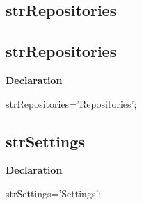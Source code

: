 \documentclass{report}
\newif\ifpdf
\begin{document}
\subsection*{\large{\textbf{strRepositories}}\normalsize\hspace{1ex}\hrulefill}
\else
\subsection*{strRepositories}
\fi
\label{trstrings-strRepositories}
\begin{list}{}{
\setlength{\itemindent}{0cm}
\setlength{\listparindent}{0cm}
\setlength{\leftmargin}{\evensidemargin}
\addtolength{\leftmargin}{\tmplength}
\settowidth{\labelsep}{X}
\addtolength{\leftmargin}{\labelsep}
\setlength{\labelwidth}{\tmplength}
}
\item[\textbf{Declaration}\hfill]
\ifpdf
\begin{flushleft}
\fi
\begin{ttfamily}
strRepositories='Repositories';\end{ttfamily}

\ifpdf
\end{flushleft}
\fi

\end{list}
\ifpdf
\subsection*{\large{\textbf{strSettings}}\normalsize\hspace{1ex}\hrulefill}
\else
\subsection*{strSettings}
\fi
\label{trstrings-strSettings}
\begin{list}{}{
\setlength{\itemindent}{0cm}
\setlength{\listparindent}{0cm}
\setlength{\leftmargin}{\evensidemargin}
\addtolength{\leftmargin}{\tmplength}
\settowidth{\labelsep}{X}
\addtolength{\leftmargin}{\labelsep}
\setlength{\labelwidth}{\tmplength}
}
\item[\textbf{Declaration}\hfill]
\ifpdf
\begin{flushleft}
\fi
\begin{ttfamily}
strSettings='Settings';\end{ttfamily}

\ifpdf
\end{flushleft}
\fi

\end{list}
\ifpdf
\end{document}

